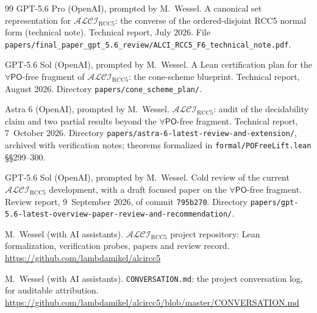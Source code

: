 \documentclass[11pt]{article}
\newcommand{\ALCIRCC}[1]{\mathcal{ALCI}_{\mathrm{RCC#1}}}
\newcommand{\PO}{\mathsf{PO}}
\theoremstyle{plain}
\theoremstyle{definition}
\begin{document}
\begin{thebibliography}{99}
GPT-5.6 Pro (OpenAI), prompted by M.\ Wessel.
\newblock A canonical set representation for $\ALCIRCC{5}$: the converse of the
  ordered-disjoint RCC5 normal form (technical note).
\newblock Technical report, July 2026.
\newblock File
  \texttt{papers/final\_paper\_gpt\_5.6\_review/ALCI\_RCC5\_F6\_technical\_note.pdf}.

GPT-5.6 Sol (OpenAI), prompted by M.\ Wessel.
\newblock A Lean certification plan for the $\forall\PO$-free fragment of
  $\ALCIRCC{5}$: the cone-scheme blueprint.
\newblock Technical report, August 2026.
\newblock Directory \texttt{papers/cone\_scheme\_plan/}.

Astra 6 (OpenAI), prompted by M.\ Wessel.
\newblock $\mathcal{ALCI}_{\mathrm{RCC5}}$: audit of the decidability claim
  and two partial results beyond the $\forall\PO$-free fragment.
\newblock Technical report, 7~October 2026.
\newblock Directory
  \texttt{papers/astra-6-latest-review-and-extension/}, archived with
  verification notes; theorems formalized in
  \texttt{formal/POFreeLift.lean} \S\S299--300.

GPT-5.6 Sol (OpenAI), prompted by M.\ Wessel.
\newblock Cold review of the current $\ALCIRCC{5}$ development, with a draft
  focused paper on the $\forall\PO$-free fragment.
\newblock Review report, 9~September 2026, of commit \texttt{795b270}.
\newblock Directory
  \texttt{papers/gpt-5.6-latest-overview-paper-review-and-recommendation/}.

M.\ Wessel (with AI assistants).
\newblock $\ALCIRCC{5}$ project repository: Lean formalization, verification
  probes, papers and review record.
\newblock \url{https://github.com/lambdamikel/alcircc5}

M.\ Wessel (with AI assistants).
\newblock \texttt{CONVERSATION.md}: the project conversation log, for auditable
  attribution.
\newblock \url{https://github.com/lambdamikel/alcircc5/blob/master/CONVERSATION.md}

\end{thebibliography}
\end{document}
